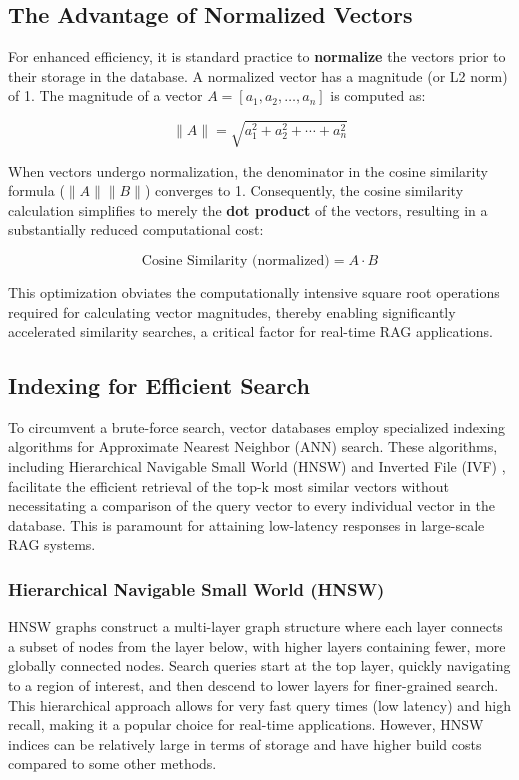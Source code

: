 \subsection{The Advantage of Normalized Vectors}
For enhanced efficiency, it is standard practice to \textbf{normalize} the vectors prior to their storage in the database. A normalized vector has a magnitude (or L2 norm) of 1. The magnitude of a vector \(A = [a_1, a_2, \ldots, a_n]\) is computed as:

\begin{equation}
\|A\| = \sqrt{a_1^2 + a_2^2 + \cdots + a_n^2}
\end{equation}

When vectors undergo normalization, the denominator in the cosine similarity formula (\(\|A\| \|B\|\)) converges to 1. Consequently, the cosine similarity calculation simplifies to merely the \textbf{dot product} of the vectors, resulting in a substantially reduced computational cost:

\begin{equation}
\text{Cosine Similarity (normalized)} = A \cdot B
\end{equation}

This optimization obviates the computationally intensive square root operations required for calculating vector magnitudes, thereby enabling significantly accelerated similarity searches, a critical factor for real-time RAG applications.


\subsection{Indexing for Efficient Search}
To circumvent a brute-force search, vector databases employ specialized indexing algorithms for Approximate Nearest Neighbor (ANN) search. These algorithms, including Hierarchical Navigable Small World (HNSW) \autocite{hnsw_malkov_2018} and Inverted File (IVF) \autocite{ivf_zobel}, facilitate the efficient retrieval of the top-k most similar vectors without necessitating a comparison of the query vector to every individual vector in the database. This is paramount for attaining low-latency responses in large-scale RAG systems.

\subsubsection{Hierarchical Navigable Small World (HNSW)}
HNSW graphs construct a multi-layer graph structure where each layer connects a subset of nodes from the layer below, with higher layers containing fewer, more globally connected nodes. Search queries start at the top layer, quickly navigating to a region of interest, and then descend to lower layers for finer-grained search. This hierarchical approach allows for very fast query times (low latency) and high recall, making it a popular choice for real-time applications. However, HNSW indices can be relatively large in terms of storage and have higher build costs compared to some other methods.

